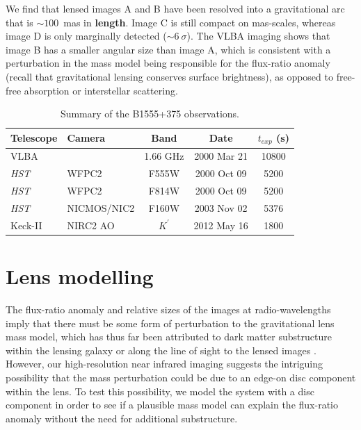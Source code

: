 \documentclass[a4paper,fleqn,usenatbib,useAMS]{mnras}
\begin{document}
We find that lensed images A and B have been resolved into a gravitational arc that is $\sim100$~mas in {\bf length}. Image C is still compact on mas-scales, whereas image D is only marginally detected ($\sim6~\sigma$). 
The VLBA imaging shows that image B has a smaller angular size than image A, which is consistent with a perturbation in the mass model being responsible for the flux-ratio anomaly (recall that gravitational lensing conserves surface brightness), as opposed to free-free absorption or interstellar scattering.

\begin{table}
\centering
\caption{Summary of the B1555+375 observations.}
\begin{tabular}{llccc}
\hline
Telescope		& Camera			&  Band 		& Date				&$t_{exp}$ (s) \\
\hline
VLBA			&					& 1.66 GHz	& 	2000 Mar 21	& 10800\\
\textit{HST}	& WFPC2    		& F555W		&	2000 Oct 09	& 5200\\
\textit{HST}	& WFPC2    		& F814W		&	2000 Oct 09 	& 5200\\
\textit{HST}	& NICMOS/NIC2	& F160W		&	2003 Nov 02	& 5376\\
Keck-II			& NIRC2 AO		& $K^\prime$	& 	2012 May 16	& 1800\\
\hline
\end{tabular}
\label{tab:obs}
\end{table}

\section{Lens modelling}

The flux-ratio anomaly and relative sizes of the images at radio-wavelengths imply that there must be some form of perturbation to the gravitational lens mass model, which has thus far been attributed to dark matter substructure within the lensing galaxy or along the line of sight to the lensed images \citep{Dalal2002,Xu12,Xu15}. However, our high-resolution near infrared imaging suggests the intriguing possibility that the mass perturbation could be due to an edge-on disc component within the lens. To test this possibility, we model the system with a disc component in order to see if a plausible mass model can explain the flux-ratio anomaly without the need for additional substructure.
\end{document}
